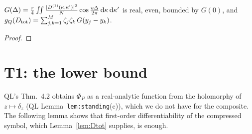 \documentclass[11pt]{article}
\newcommand{\Dtot}{D_{\rm tot}}\newcommand{\Rp}{\mathsf R}\newcommand{\Lp}{\mathsf L}\newcommand{\Sch}{\mathcal S}
\theoremstyle{definition}\newtheorem{hypothesis}[theorem]{Hypothesis}
\begin{document}
\begin{lemma}[Polarisation]\label{lem:polar}
$G(\Delta)=\frac r4\iint\frac{\lvert D^{(1)}(\kappa,\kappa')\rvert^2}N\cos\frac{u\Delta}{2\pi}\,\mathrm d\kappa\,\mathrm d\kappa'$ is
real, even, bounded by $G(0)$, and $g_Q(\Dtot)=\sum_{j,k=1}^M\zeta_j\zeta_k\,G(y_j-y_k)$.
\end{lemma}
\begin{proof}
\end{proof}

\section{T1: the lower bound}\label{sec:T1}
QL's Thm.~4.2 obtains $\Phi_P$ as a real-analytic function from the holomorphy of $z\mapsto\delta_z$ (QL
Lemma~\texttt{lem:standing}(c)), which we do not have for the composite.  The following lemma shows that
first-order differentiability of the compressed symbol, which Lemma~\ref{lem:Dtot} supplies, is enough.
\end{document}
